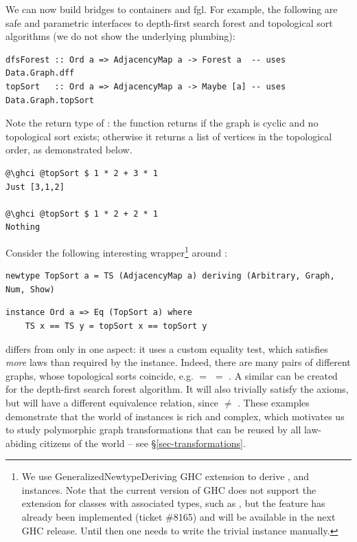 We can now build bridges to \textsf{containers} and \textsf{fgl}. For example,
the following are safe and parametric interfaces to depth-first
search forest and topological sort algorithms (we do not show the underlying plumbing):

\begin{verbatim}
dfsForest :: Ord a => AdjacencyMap a -> Forest a  -- uses Data.Graph.dff
topSort   :: Ord a => AdjacencyMap a -> Maybe [a] -- uses Data.Graph.topSort
\end{verbatim}

\noindent
Note the return type of : the function returns 
if the graph is cyclic and no topological sort exists; otherwise it
returns a list of vertices in the topological order, as demonstrated below.

\begin{verbatim}
@\ghci @topSort $ 1 * 2 + 3 * 1
Just [3,1,2]

@\ghci @topSort $ 1 * 2 + 2 * 1
Nothing
\end{verbatim}

Consider the following interesting
wrapper\footnote{We use \textsf{GeneralizedNewtypeDeriving} GHC
extension to derive ,  and  instances. Note that
the current version of GHC does not support the extension for classes
with associated types, such as , but the feature has already been
implemented (ticket \#8165) and will be available in the next GHC release.
Until then one needs to write the trivial  instance manually.}
around :

\begin{verbatim}
newtype TopSort a = TS (AdjacencyMap a) deriving (Arbitrary, Graph, Num, Show)
\end{verbatim}
\vspace{1mm}
\begin{verbatim}
instance Ord a => Eq (TopSort a) where
    TS x == TS y = topSort x == topSort y
\end{verbatim}

\noindent
{} differs from  only in one aspect: it uses
a custom equality test, which satisfies \emph{more} laws than required by the 
instance. Indeed, there are many pairs of different graphs, whose topological sorts
coincide, e.g.  $=$  $=$ .
A similar  can be created for the depth-first search
forest algorithm. It will also trivially satisfy the  axioms, but will have
a different equivalence relation, since  $\neq$ .
These examples demonstrate that the world of  instances is rich and complex,
which motivates us to study polymorphic graph transformations that can be reused by
all law-abiding citizens of the  world -- see \S\ref{sec-transformations}.

